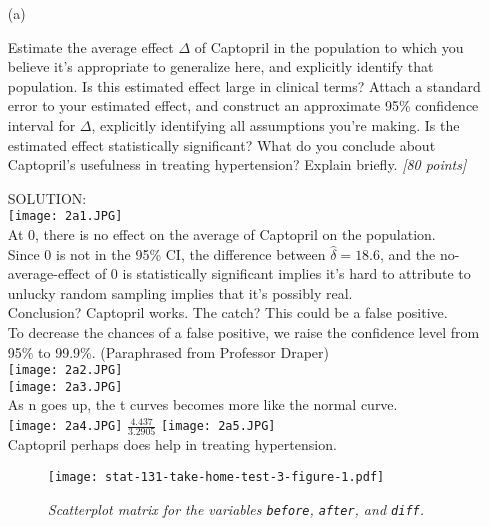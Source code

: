\documentclass[12pt]{article}
\begin{document}
\begin{itemize}

\item[(a)]

Estimate the average effect $\Delta$ of Captopril in the population to
which you believe it's appropriate to generalize here, and explicitly
identify that population. Is this estimated effect large in clinical
terms? Attach a standard error to your estimated effect, and construct an
approximate 95\% confidence interval for $\Delta$, explicitly identifying all assumptions you're making. Is the estimated effect
statistically significant? What do you conclude about Captopril's
usefulness in treating hypertension? Explain briefly. \textit{[80 points]}

SOLUTION:\\
\texttt{[image: 2a1.JPG]} \\
At 0, there is no effect on the average of Captopril on the population. \\
Since 0 is not in the 95\% CI, the difference between $\hat{\delta} = 18.6$, and the no-average-effect of 0 is statistically significant implies it's hard to attribute to unlucky random sampling implies that it's possibly real. \\
Conclusion? Captopril works. The catch? This could be a false positive. \\
To decrease the chances of a false positive, we raise the confidence level from 95\% to 99.9\%. (Paraphrased from Professor Draper)\\
\texttt{[image: 2a2.JPG]} \\
\texttt{[image: 2a3.JPG]} \\
As n goes up, the t curves becomes more like the normal curve. \\
\texttt{[image: 2a4.JPG]} $\frac{4.437}{3.2905}$ \texttt{[image: 2a5.JPG]} \\
Captopril perhaps does help in treating hypertension. 
\begin{figure}[!b]
\begin{center}

\texttt{[image: stat-131-take-home-test-3-figure-1.pdf]}

\caption{\textit{Scatterplot matrix for the variables \texttt{before},
\texttt{after}, and \texttt{diff}.}}

\vspace*{-0.3in}

\end{center}


\end{figure}
\end{itemize}
\end{document}
